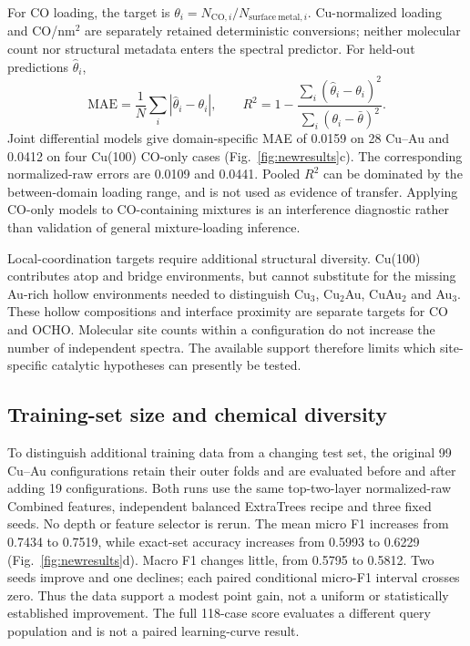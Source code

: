 \documentclass[11pt,a4paper]{article}
\begin{document}
For CO loading, the target is $\theta_i=N_{\mathrm{CO},i}/N_{\mathrm{surface\ metal},i}$. Cu-normalized loading and CO/nm$^2$ are separately retained deterministic conversions; neither molecular count nor structural metadata enters the spectral predictor. For held-out predictions $\hat\theta_i$,
\begin{equation}
\mathrm{MAE}=\frac{1}{N}\sum_i|\hat\theta_i-\theta_i|,\qquad
R^2=1-\frac{\sum_i(\hat\theta_i-\theta_i)^2}{\sum_i(\theta_i-\bar\theta)^2}.
\end{equation}
Joint differential models give domain-specific MAE of 0.0159 on 28 Cu--Au and 0.0412 on four Cu(100) CO-only cases (Fig.~\ref{fig:newresults}c). The corresponding normalized-raw errors are 0.0109 and 0.0441. Pooled $R^2$ can be dominated by the between-domain loading range, and is not used as evidence of transfer. Applying CO-only models to CO-containing mixtures is an interference diagnostic rather than validation of general mixture-loading inference.

Local-coordination targets require additional structural diversity. Cu(100) contributes atop and bridge environments, but cannot substitute for the missing Au-rich hollow environments needed to distinguish Cu$_3$, Cu$_2$Au, CuAu$_2$ and Au$_3$. These hollow compositions and interface proximity are separate targets for CO and OCHO. Molecular site counts within a configuration do not increase the number of independent spectra. The available support therefore limits which site-specific catalytic hypotheses can presently be tested.

\subsection{Training-set size and chemical diversity}
To distinguish additional training data from a changing test set, the original 99 Cu--Au configurations retain their outer folds and are evaluated before and after adding 19 configurations. Both runs use the same top-two-layer normalized-raw Combined features, independent balanced ExtraTrees recipe and three fixed seeds. No depth or feature selector is rerun. The mean micro F1 increases from 0.7434 to 0.7519, while exact-set accuracy increases from 0.5993 to 0.6229 (Fig.~\ref{fig:newresults}d). Macro F1 changes little, from 0.5795 to 0.5812. Two seeds improve and one declines; each paired conditional micro-F1 interval crosses zero. Thus the data support a modest point gain, not a uniform or statistically established improvement. The full 118-case score evaluates a different query population and is not a paired learning-curve result.
\end{document}
